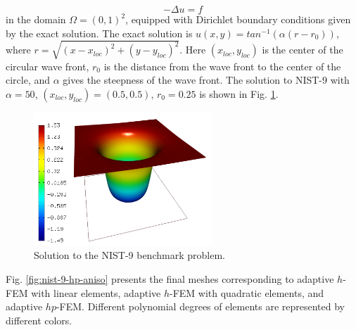 \documentclass[12pt]{elsarticle}
\begin{document}
\begin{equation} \label{wave-front}
-\Delta u = f
\end{equation}
in the domain $\Omega = (0, 1)^2$, equipped with Dirichlet boundary conditions
given by the exact solution. The exact solution is
$u(x, y) = tan^{-1}(\alpha (r - r_{0}))$,
where $r = \sqrt{(x - x_{loc})^{2} + (y - y_{loc})^{2}}$.
Here $(x_{loc}, y_{loc})$ is the center of the circular wave front,
$r_{0}$ is the distance from the wave front to the center of the circle,
and $\alpha$ gives the steepness of the wave front.
The solution to NIST-9 with $\alpha = 50$, $(x_{loc}, y_{loc}) = (0.5, 0.5)$,
$r_{0} = 0.25$ is shown in Fig. \ref{fig:sln-nist09}.

\begin{figure}[H]
\centering
\vspace{-3mm}
\includegraphics[height=5cm]{nist/nist-9/solution.png}
\vspace{-3mm}
\caption{Solution to the NIST-9 benchmark problem.}
\vspace{-3mm}
\label{fig:sln-nist09}
\end{figure}

Fig. \ref{fig:nist-9-hp-aniso} presents the final meshes corresponding to adaptive $h$-FEM with
linear elements, adaptive $h$-FEM with quadratic elements, and adaptive $hp$-FEM. Different
polynomial degrees of elements are represented by different colors.
\end{document}
